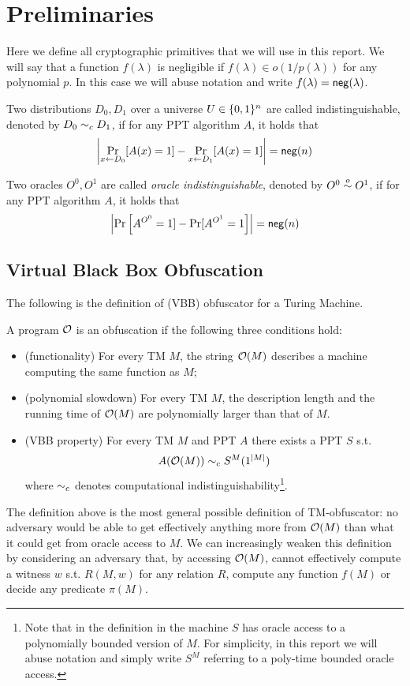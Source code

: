 \section{Preliminaries}

Here we define all cryptographic primitives that we will use in this report. We will say that a function $f(\lambda)$ is negligible if $f(\lambda)\in o(1/p(\lambda))$ for any polynomial $p$. In this case we will abuse notation and write $f(\lambda)=\mathsf{neg}(\lambda)$.

Two distributions $D_0,D_1$ over a universe $U\in\{0,1\}^n$ are called indistinguishable, denoted by $D_0\sim_c D_1$, if for any PPT algorithm $A$, it holds that
\[
\left|\Pr_{x\gets D_0}[A(x)=1]-\Pr_{x\gets D_1}[A(x)=1]\right|=\mathsf{neg}(n)
\]

Two oracles $O^0,O^1$ are called \emph{oracle indistinguishable}, denoted by $O^0\overset{o}{\sim} O^1$, if for any PPT algorithm $A$, it holds that
\[
\left|\Pr\left[A^{O^0}=1]-\Pr[A^{O^1}=1\right]\right|=\mathsf{neg}(n)
\]

\subsection{Virtual Black Box Obfuscation}
\label{subsec:VBB}
The following is the definition of (VBB) obfuscator for a Turing Machine.

\begin{mydef}[TM-obfuscator]
\label{def:VBB-tm}
A program $\mathcal{O}$ is an obfuscation if the following three conditions hold: %
\begin{itemize}
\item (functionality) For every TM $M$, the string $\mathcal{O}(M)$ describes a machine computing the same function as $M$;
\item (polynomial slowdown)  For every TM $M$, the description length and the running time of $\mathcal{O}(M)$ are polynomially larger than that of $M$.
\item (VBB property) For every TM $M$ and PPT $A$ there exists a PPT $S$ s.t. 
$$ A(\mathcal{O}(M)) \sim_c S^M(1^{|M|}) $$
where $\sim_c$ denotes computational indistinguishability\footnote{Note that in the definition in \cite{VBB-imp} the machine $S$ has oracle access to a polynomially bounded version of $M$. For simplicity, in this report we will abuse notation and simply write $S^M$ referring to a poly-time bounded oracle access. }.
\end{itemize}
\end{mydef}

The definition above is the most general possible definition of TM-obfuscator: no adversary would be able to get effectively anything more from $\mathcal{O}(M)$ than what it could get from oracle access to $M$. We can increasingly weaken this definition by considering an adversary that, by accessing $\mathcal{O}(M)$, cannot effectively compute a witness $w$ s.t. $R(M,w)$ for any relation $R$, compute any function $f(M)$ or decide any predicate $\pi(M)$.




